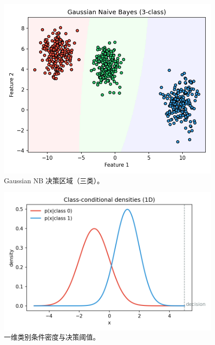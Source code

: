 \documentclass[UTF8,zihao=-4]{ctexart}
\begin{document}
\begin{figure}[H]
  \centering
  \includegraphics[width=0.9\linewidth]{gnb_decision_boundary_3class.png}
  \caption{Gaussian NB 决策区域（三类）。}
  \label{fig:gnb3_cn}
\end{figure}
\FloatBarrier

\begin{figure}[H]
  \centering
  \includegraphics[width=0.9\linewidth]{class_conditional_densities_1d.png}
  \caption{一维类别条件密度与决策阈值。}
  \label{fig:dens1d_cn}
\end{figure}
\FloatBarrier
\end{document}
